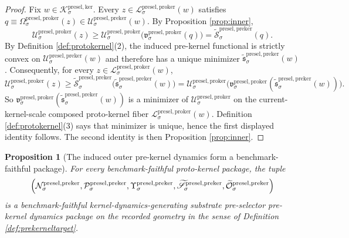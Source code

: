 \documentclass[11pt]{article}
\newcommand{\KernelBody}[1]{\mathcal K_{#1}^{\mathrm{presel,ker}}}
\newcommand{\PreKernelSpace}[1]{\mathcal N_{#1}^{\mathrm{presel,preker}}}
\newcommand{\PreKernelBody}[1]{\mathcal P_{#1}^{\mathrm{presel,preker}}}
\newcommand{\PreKernelProj}[1]{\Upsilon_{#1}^{\mathrm{presel,preker}}}
\newcommand{\PreKernelFiber}[2]{\mathcal U_{#1}^{\mathrm{presel,preker}}(#2)}
\newcommand{\ProtoKernelProj}[1]{\Omega_{#1}^{\mathrm{presel,proker}}}
\newcommand{\ProtoKernelFunctional}[1]{\mathscr U_{#1}^{\mathrm{presel,proker}}}
\newcommand{\ProtoKernelMinLift}[1]{\mathfrak v_{#1}^{\mathrm{presel,proker}}}
\newcommand{\ProtoKernelKernelFiber}[2]{\mathcal L_{#1}^{\mathrm{presel,proker}}(#2)}
\newcommand{\InducedPreKernelFunctional}[1]{\widetilde{\mathscr S}_{#1}^{\mathrm{presel,preker}}}
\newcommand{\InducedPreKernelMinLift}[1]{\widetilde{\mathfrak s}_{#1}^{\mathrm{presel,preker}}}
\newcommand{\InducedPreKernelShell}[1]{\widetilde{\mathcal O}_{#1}^{\mathrm{presel,preker}}}
\newtheorem{proposition}{Proposition}
\begin{document}
\begin{proof}
Fix \(w\in\KernelBody{\sigma}\). Every \(z\in\ProtoKernelKernelFiber{\sigma}{w}\) satisfies \(q\equiv\ProtoKernelProj{\sigma}(z)\in\PreKernelFiber{\sigma}{w}\). By Proposition \ref{prop:inner},
\[
\ProtoKernelFunctional{\sigma}(z)
\geq
\ProtoKernelFunctional{\sigma}\bigl(\ProtoKernelMinLift{\sigma}(q)\bigr)
=
\InducedPreKernelFunctional{\sigma}(q).
\]
By Definition \ref{def:protokernel}(2), the induced pre-kernel functional is strictly convex on \(\PreKernelFiber{\sigma}{w}\) and therefore has a unique minimizer \(\InducedPreKernelMinLift{\sigma}(w)\). Consequently, for every \(z\in\ProtoKernelKernelFiber{\sigma}{w}\),
\[
\ProtoKernelFunctional{\sigma}(z)
\geq
\InducedPreKernelFunctional{\sigma}\bigl(\InducedPreKernelMinLift{\sigma}(w)\bigr)
=
\ProtoKernelFunctional{\sigma}\bigl(\ProtoKernelMinLift{\sigma}(\InducedPreKernelMinLift{\sigma}(w))\bigr).
\]
So \(\ProtoKernelMinLift{\sigma}(\InducedPreKernelMinLift{\sigma}(w))\) is a minimizer of \(\ProtoKernelFunctional{\sigma}\) on the current-kernel-scale composed proto-kernel fiber \(\ProtoKernelKernelFiber{\sigma}{w}\). Definition \ref{def:protokernel}(3) says that minimizer is unique, hence the first displayed identity follows. The second identity is then Proposition \ref{prop:inner}.
\end{proof}

\begin{proposition}[The induced outer pre-kernel dynamics form a benchmark-faithful package]
\label{prop:prekernel}
For every benchmark-faithful proto-kernel package, the tuple
\[
\Bigl(
\PreKernelSpace{\sigma},
\PreKernelBody{\sigma},
\PreKernelProj{\sigma},
\InducedPreKernelFunctional{\sigma},
\InducedPreKernelShell{\sigma}
\Bigr)
\]
is a benchmark-faithful kernel-dynamics-generating substrate pre-selector pre-kernel dynamics package on the recorded geometry in the sense of Definition \ref{def:prekerneltarget}.
\end{proposition}
\end{document}
